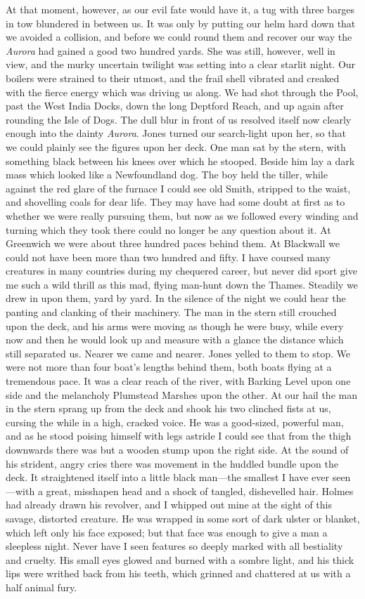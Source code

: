 At that moment, however, as our evil fate would have it, a tug with three barges in tow blundered in between us. It was only by putting our helm hard down that we avoided a collision, and before we could round them and recover our way the \textit{Aurora} had gained a good two hundred yards. She was still, however, well in view, and the murky uncertain twilight was setting into a clear starlit night. Our boilers were strained to their utmost, and the frail shell vibrated and creaked with the fierce energy which was driving us along. We had shot through the Pool, past the West India Docks, down the long Deptford Reach, and up again after rounding the Isle of Dogs. The dull blur in front of us resolved itself now clearly enough into the dainty \textit{Aurora}. Jones turned our search-light upon her, so that we could plainly see the figures upon her deck. One man sat by the stern, with something black between his knees over which he stooped. Beside him lay a dark mass which looked like a Newfoundland dog. The boy held the tiller, while against the red glare of the furnace I could see old Smith, stripped to the waist, and shovelling coals for dear life. They may have had some doubt at first as to whether we were really pursuing them, but now as we followed every winding and turning which they took there could no longer be any question about it. At Greenwich we were about three hundred paces behind them. At Blackwall we could not have been more than two hundred and fifty. I have coursed many creatures in many countries during my chequered career, but never did sport give me such a wild thrill as this mad, flying man-hunt down the Thames. Steadily we drew in upon them, yard by yard. In the silence of the night we could hear the panting and clanking of their machinery. The man in the stern still crouched upon the deck, and his arms were moving as though he were busy, while every now and then he would look up and measure with a glance the distance which still separated us. Nearer we came and nearer. Jones yelled to them to stop. We were not more than four boat's lengths behind them, both boats flying at a tremendous pace. It was a clear reach of the river, with Barking Level upon one side and the melancholy Plumstead Marshes upon the other. At our hail the man in the stern sprang up from the deck and shook his two clinched fists at us, cursing the while in a high, cracked voice. He was a good-sized, powerful man, and as he stood poising himself with legs astride I could see that from the thigh downwards there was but a wooden stump upon the right side. At the sound of his strident, angry cries there was movement in the huddled bundle upon the deck. It straightened itself into a little black man—the smallest I have ever seen—with a great, misshapen head and a shock of tangled, dishevelled hair. Holmes had already drawn his revolver, and I whipped out mine at the sight of this savage, distorted creature. He was wrapped in some sort of dark ulster or blanket, which left only his face exposed; but that face was enough to give a man a sleepless night. Never have I seen features so deeply marked with all bestiality and cruelty. His small eyes glowed and burned with a sombre light, and his thick lips were writhed back from his teeth, which grinned and chattered at us with a half animal fury.

